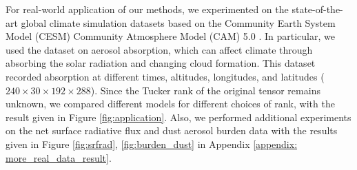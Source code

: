 For real-world application of our methods, we experimented on the state-of-the-art global climate simulation datasets based on the Community Earth System Model (CESM) Community Atmosphere Model (CAM) 5.0 \cite{hurrell2013community,kay2015community}. In particular, we used the dataset on aerosol absorption, which can affect climate through absorbing the solar radiation and changing cloud formation. This dataset recorded absorption at different times, altitudes, longitudes, and latitudes  ($240 \times 30 \times 192 \times 288$). Since the Tucker rank of the original tensor remains unknown, we compared different models for different choices of rank, with the result given in Figure \ref{fig:application}. Also, we performed additional experiments on the net surface radiative flux and dust aerosol burden data with the results given in Figure \ref{fig:srfrad}, \ref{fig:burden_dust} in Appendix \ref{appendix: more_real_data_result}. 

